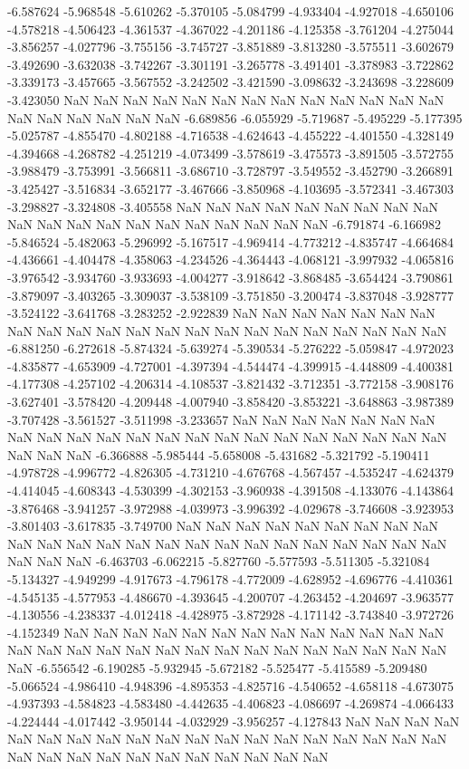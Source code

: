 -6.587624
-5.968548
-5.610262
-5.370105
-5.084799
-4.933404
-4.927018
-4.650106
-4.578218
-4.506423
-4.361537
-4.367022
-4.201186
-4.125358
-3.761204
-4.275044
-3.856257
-4.027796
-3.755156
-3.745727
-3.851889
-3.813280
-3.575511
-3.602679
-3.492690
-3.632038
-3.742267
-3.301191
-3.265778
-3.491401
-3.378983
-3.722862
-3.339173
-3.457665
-3.567552
-3.242502
-3.421590
-3.098632
-3.243698
-3.228609
-3.423050
NaN
NaN
NaN
NaN
NaN
NaN
NaN
NaN
NaN
NaN
NaN
NaN
NaN
NaN
NaN
NaN
NaN
NaN
NaN
-6.689856
-6.055929
-5.719687
-5.495229
-5.177395
-5.025787
-4.855470
-4.802188
-4.716538
-4.624643
-4.455222
-4.401550
-4.328149
-4.394668
-4.268782
-4.251219
-4.073499
-3.578619
-3.475573
-3.891505
-3.572755
-3.988479
-3.753991
-3.566811
-3.686710
-3.728797
-3.549552
-3.452790
-3.266891
-3.425427
-3.516834
-3.652177
-3.467666
-3.850968
-4.103695
-3.572341
-3.467303
-3.298827
-3.324808
-3.405558
NaN
NaN
NaN
NaN
NaN
NaN
NaN
NaN
NaN
NaN
NaN
NaN
NaN
NaN
NaN
NaN
NaN
NaN
NaN
NaN
-6.791874
-6.166982
-5.846524
-5.482063
-5.296992
-5.167517
-4.969414
-4.773212
-4.835747
-4.664684
-4.436661
-4.404478
-4.358063
-4.234526
-4.364443
-4.068121
-3.997932
-4.065816
-3.976542
-3.934760
-3.933693
-4.004277
-3.918642
-3.868485
-3.654424
-3.790861
-3.879097
-3.403265
-3.309037
-3.538109
-3.751850
-3.200474
-3.837048
-3.928777
-3.524122
-3.641768
-3.283252
-2.922839
NaN
NaN
NaN
NaN
NaN
NaN
NaN
NaN
NaN
NaN
NaN
NaN
NaN
NaN
NaN
NaN
NaN
NaN
NaN
NaN
NaN
NaN
-6.881250
-6.272618
-5.874324
-5.639274
-5.390534
-5.276222
-5.059847
-4.972023
-4.835877
-4.653909
-4.727001
-4.397394
-4.544474
-4.399915
-4.448809
-4.400381
-4.177308
-4.257102
-4.206314
-4.108537
-3.821432
-3.712351
-3.772158
-3.908176
-3.627401
-3.578420
-4.209448
-4.007940
-3.858420
-3.853221
-3.648863
-3.987389
-3.707428
-3.561527
-3.511998
-3.233657
NaN
NaN
NaN
NaN
NaN
NaN
NaN
NaN
NaN
NaN
NaN
NaN
NaN
NaN
NaN
NaN
NaN
NaN
NaN
NaN
NaN
NaN
NaN
NaN
NaN
-6.366888
-5.985444
-5.658008
-5.431682
-5.321792
-5.190411
-4.978728
-4.996772
-4.826305
-4.731210
-4.676768
-4.567457
-4.535247
-4.624379
-4.414045
-4.608343
-4.530399
-4.302153
-3.960938
-4.391508
-4.133076
-4.143864
-3.876468
-3.941257
-3.972988
-4.039973
-3.996392
-4.029678
-3.746608
-3.923953
-3.801403
-3.617835
-3.749700
NaN
NaN
NaN
NaN
NaN
NaN
NaN
NaN
NaN
NaN
NaN
NaN
NaN
NaN
NaN
NaN
NaN
NaN
NaN
NaN
NaN
NaN
NaN
NaN
NaN
NaN
NaN
-6.463703
-6.062215
-5.827760
-5.577593
-5.511305
-5.321084
-5.134327
-4.949299
-4.917673
-4.796178
-4.772009
-4.628952
-4.696776
-4.410361
-4.545135
-4.577953
-4.486670
-4.393645
-4.200707
-4.263452
-4.204697
-3.963577
-4.130556
-4.238337
-4.012418
-4.428975
-3.872928
-4.171142
-3.743840
-3.972726
-4.152349
NaN
NaN
NaN
NaN
NaN
NaN
NaN
NaN
NaN
NaN
NaN
NaN
NaN
NaN
NaN
NaN
NaN
NaN
NaN
NaN
NaN
NaN
NaN
NaN
NaN
NaN
NaN
NaN
NaN
-6.556542
-6.190285
-5.932945
-5.672182
-5.525477
-5.415589
-5.209480
-5.066524
-4.986410
-4.948396
-4.895353
-4.825716
-4.540652
-4.658118
-4.673075
-4.937393
-4.584823
-4.583480
-4.442635
-4.406823
-4.086697
-4.269874
-4.066433
-4.224444
-4.017442
-3.950144
-4.032929
-3.956257
-4.127843
NaN
NaN
NaN
NaN
NaN
NaN
NaN
NaN
NaN
NaN
NaN
NaN
NaN
NaN
NaN
NaN
NaN
NaN
NaN
NaN
NaN
NaN
NaN
NaN
NaN
NaN
NaN
NaN
NaN
NaN

